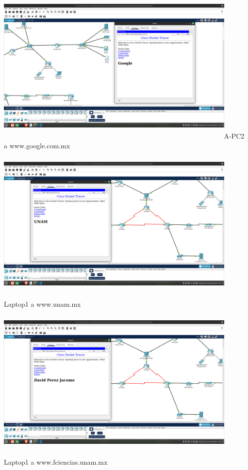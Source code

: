 \documentclass[14pt]{book}
\begin{document}
\includegraphics[width=12cm, height=8cm]{images/captura2.png}A-PC2 a www.google.com.mx\\

\includegraphics[width=12cm, height=8cm]{images/captura3.png}Laptop1 a www.unam.mx\\

\includegraphics[width=12cm, height=8cm]{images/captura4.png}Laptop1 a   www.fciencias.unam.mx\\
\end{document}
